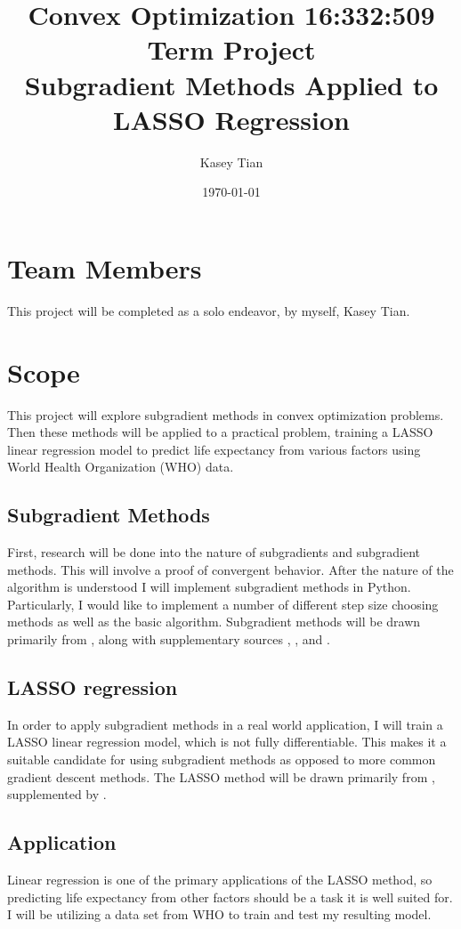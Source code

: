 \documentclass[12pt, letterpaper]{article}
\title{Convex Optimization 16:332:509 \\
Term Project\\
Subgradient Methods Applied to LASSO Regression
}
\author{Kasey Tian}
\date{\today}
\begin{document}
\maketitle
\section{Team Members}
This project will be completed as a solo endeavor, by myself, Kasey Tian.
\section{Scope}
This project will explore subgradient methods in convex optimization problems. Then these methods will be applied to a practical problem, training a LASSO linear regression model to predict life expectancy from various factors using World Health Organization (WHO) data. 

\subsection{Subgradient Methods}
First, research will be done into the nature of subgradients and subgradient methods. This will involve a proof of convergent behavior. After the nature of the algorithm is understood I will implement subgradient methods in Python. Particularly, I would like to implement a number of different step size choosing methods as well as the basic algorithm. Subgradient methods will be drawn primarily from \cite{subgradient}, along with supplementary sources \cite{subgradient2}, \cite{subgradient3}, and \cite{both}.

\subsection{LASSO regression}
In order to apply subgradient methods in a real world application, I will train a LASSO linear regression model, which is not fully differentiable. This makes it a suitable candidate for using subgradient methods as opposed to more common gradient descent methods. The LASSO method will be drawn primarily from \cite{lasso}, supplemented by \cite{both}. 

\subsection{Application}
Linear regression is one of the primary applications of the LASSO method, so predicting life expectancy from other factors should be a task it is well suited for. I will be utilizing a data set from WHO \cite{dataset} to train and test my resulting model.
\end{document}

